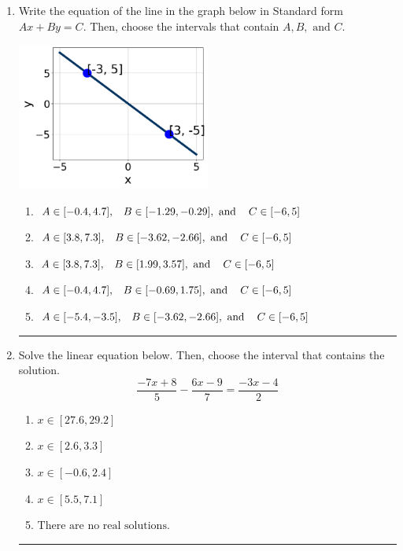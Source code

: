 \documentclass[14pt]{extbook}
\newcommand{\litem}[1]{\item#1\hspace*{-1cm}\rule{\textwidth}{0.4pt}}
\begin{document}
\begin{enumerate}
\litem{
Write the equation of the line in the graph below in Standard form $Ax+By=C$. Then, choose the intervals that contain $A, B, \text{ and } C$.
\begin{center}
    \includegraphics[width=0.5\textwidth]{../Figures/linearGraphToStandardCopyA.png}
\end{center}
\begin{enumerate}[label=\Alph*.]
\item \( A \in [-0.4, 4.7], \hspace{3mm} B \in [-1.29, -0.29], \text{ and } \hspace{3mm} C \in [-6, 5] \)
\item \( A \in [3.8, 7.3], \hspace{3mm} B \in [-3.62, -2.66], \text{ and } \hspace{3mm} C \in [-6, 5] \)
\item \( A \in [3.8, 7.3], \hspace{3mm} B \in [1.99, 3.57], \text{ and } \hspace{3mm} C \in [-6, 5] \)
\item \( A \in [-0.4, 4.7], \hspace{3mm} B \in [-0.69, 1.75], \text{ and } \hspace{3mm} C \in [-6, 5] \)
\item \( A \in [-5.4, -3.5], \hspace{3mm} B \in [-3.62, -2.66], \text{ and } \hspace{3mm} C \in [-6, 5] \)

\end{enumerate} }
\litem{
Solve the linear equation below. Then, choose the interval that contains the solution.\[ \frac{-7x + 8}{5} - \frac{6x -9}{7} = \frac{-3x -4}{2} \]\begin{enumerate}[label=\Alph*.]
\item \( x \in [27.6, 29.2] \)
\item \( x \in [2.6, 3.3] \)
\item \( x \in [-0.6, 2.4] \)
\item \( x \in [5.5, 7.1] \)
\item \( \text{There are no real solutions.} \)


\end{enumerate}}
\end{enumerate}
\end{document}
